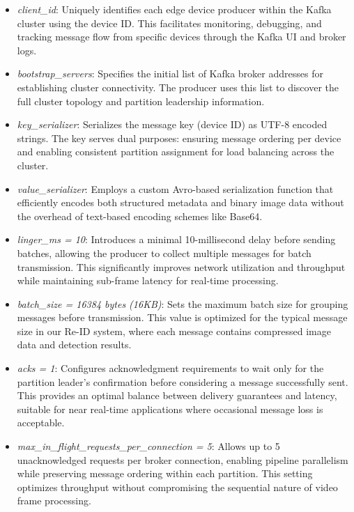 \begin{itemize}
    \item \textit{client\_id}: Uniquely identifies each edge device producer within the Kafka cluster using the device ID. This facilitates monitoring, debugging, and tracking message flow from specific devices through the Kafka UI and broker logs.
    
    \item \textit{bootstrap\_servers}: Specifies the initial list of Kafka broker addresses for establishing cluster connectivity. The producer uses this list to discover the full cluster topology and partition leadership information.
    
    \item \textit{key\_serializer}: Serializes the message key (device ID) as UTF-8 encoded strings. The key serves dual purposes: ensuring message ordering per device and enabling consistent partition assignment for load balancing across the cluster.
    
    \item \textit{value\_serializer}: Employs a custom Avro-based serialization function that efficiently encodes both structured metadata and binary image data without the overhead of text-based encoding schemes like Base64.
    
    \item \textit{linger\_ms = 10}: Introduces a minimal 10-millisecond delay before sending batches, allowing the producer to collect multiple messages for batch transmission. This significantly improves network utilization and throughput while maintaining sub-frame latency for real-time processing.
    
    \item \textit{batch\_size = 16384 bytes (16KB)}: Sets the maximum batch size for grouping messages before transmission. This value is optimized for the typical message size in our Re-ID system, where each message contains compressed image data and detection results.
    
    \item \textit{acks = 1}: Configures acknowledgment requirements to wait only for the partition leader's confirmation before considering a message successfully sent. This provides an optimal balance between delivery guarantees and latency, suitable for near real-time applications where occasional message loss is acceptable.
    
    \item \textit{max\_in\_flight\_requests\_per\_connection = 5}: Allows up to 5 unacknowledged requests per broker connection, enabling pipeline parallelism while preserving message ordering within each partition. This setting optimizes throughput without compromising the sequential nature of video frame processing.
\end{itemize}

